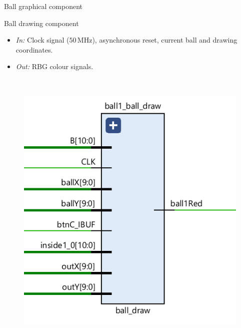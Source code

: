 \documentclass[aspectratio=169, 11pt, hyperref={unicode}]{beamer}
\def\MHz{\,\mathrm{MHz}}
\begin{document}
\begin{frame}{Ball graphical component}
    \begin{minipage}{.45\textwidth}
        Ball drawing component
        \begin{itemize}
            \item \emph{In:} Clock signal ($50\MHz$), asynchronous reset, current ball and drawing coordinates.
            \item \emph{Out:} RBG colour signals.
        \end{itemize}
    \end{minipage}
    ~
    \begin{minipage}{.45\textwidth}
        \begin{figure}[!ht]
            \centering
            \includegraphics[width=\textwidth]{src/ball-draw.png}
        \end{figure}
    \end{minipage}
\end{frame}
\end{document}
